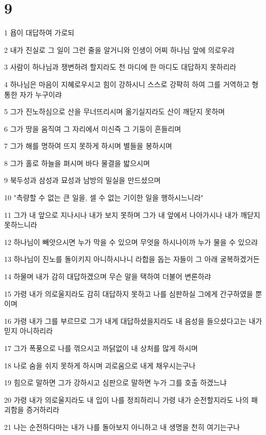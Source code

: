 \chapter{9}

\par 1 욥이 대답하여 가로되
\par 2 내가 진실로 그 일이 그런 줄을 알거니와 인생이 어찌 하나님 앞에 의로우랴
\par 3 사람이 하나님과 쟁변하려 할지라도 천 마디에 한 마디도 대답하지 못하리라
\par 4 하나님은 마음이 지혜로우시고 힘이 강하시니 스스로 강퍅히 하여 그를 거역하고 형통한 자가 누구이랴
\par 5 그가 진노하심으로 산을 무너뜨리시며 옮기실지라도 산이 깨닫지 못하며
\par 6 그가 땅을 움직여 그 자리에서 미신즉 그 기둥이 흔들리며
\par 7 그가 해를 명하여 뜨지 못하게 하시며 별들을 봉하시며
\par 8 그가 홀로 하늘을 펴시며 바다 물결을 밟으시며
\par 9 북두성과 삼성과 묘성과 남방의 밀실을 만드셨으며
\par 10 "측량할 수 없는 큰 일을, 셀 수 없는 기이한 일을 행하시느니라"
\par 11 그가 내 앞으로 지나시나 내가 보지 못하며 그가 내 앞에서 나아가시나 내가 깨닫지 못하느니라
\par 12 하나님이 빼앗으시면 누가 막을 수 있으며 무엇을 하시나이까 누가 물을 수 있으랴
\par 13 하나님이 진노를 돌이키지 아니하시나니 라합을 돕는 자들이 그 아래 굴복하겠거든
\par 14 하물며 내가 감히 대답하겠으며 무슨 말을 택하여 더불어 변론하랴
\par 15 가령 내가 의로울지라도 감히 대답하지 못하고 나를 심판하실 그에게 간구하였을 뿐이며
\par 16 가령 내가 그를 부르므로 그가 내게 대답하셨을지라도 내 음성을 들으셨다고는 내가 믿지 아니하리라
\par 17 그가 폭풍으로 나를 꺾으시고 까닭없이 내 상처를 많게 하시며
\par 18 나로 숨을 쉬지 못하게 하시며 괴로움으로 내게 채우시는구나
\par 19 힘으로 말하면 그가 강하시고 심판으로 말하면 누가 그를 호출 하겠느냐
\par 20 가령 내가 의로울지라도 내 입이 나를 정죄하리니 가령 내가 순전할지라도 나의 패괴함을 증거하리라
\par 21 나는 순전하다마는 내가 나를 돌아보지 아니하고 내 생명을 천히 여기는구나
